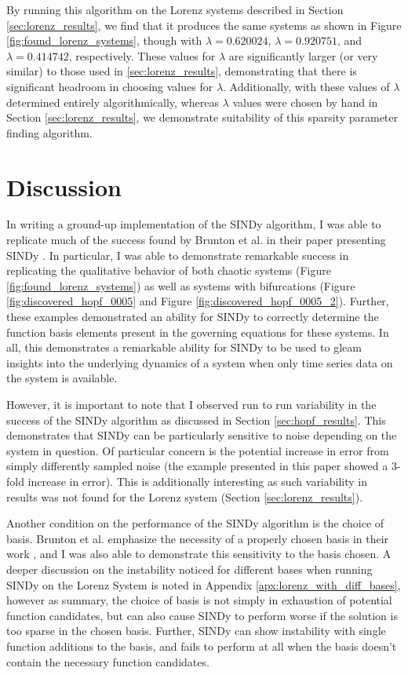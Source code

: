 \documentclass[10pt]{paper}
\begin{document}
By running this algorithm on the Lorenz systems described in Section \ref{sec:lorenz_results}, we find that it produces the same systems as shown in Figure \ref{fig:found_lorenz_systems}, though with $\lambda = 0.620024$, $\lambda = 0.920751$, and $\lambda = 0.414742$, respectively. 
These values for $\lambda$ are significantly larger (or very similar) to those used in \ref{sec:lorenz_results}, demonstrating that there is significant headroom in choosing values for $\lambda$. Additionally, with these values of $\lambda$ determined entirely algorithmically, whereas $\lambda$ values were chosen by hand in Section \ref{sec:lorenz_results}, we demonstrate suitability of this sparsity parameter finding algorithm. 




\section{Discussion} \label{sec:discussion}

In writing a ground-up implementation of the SINDy algorithm, I was able to replicate much of the success found by Brunton et al. in their paper presenting SINDy \cite{sindy}. 
In particular, I was able to demonstrate remarkable success in replicating the qualitative behavior of both chaotic systems (Figure \ref{fig:found_lorenz_systems}) as well as systems with bifurcations (Figure \ref{fig:discovered_hopf_0005} and Figure \ref{fig:discovered_hopf_0005_2}).
Further, these examples demonstrated an ability for SINDy to correctly determine the function basis elements present in the governing equations for these systems. 
In all, this demonstrates a remarkable ability for SINDy to be used to gleam insights into the underlying dynamics of a system when only time series data on the system is available. 

However, it is important to note that I observed run to run variability in the success of the SINDy algorithm as discussed in Section \ref{sec:hopf_results}.
This demonstrates that SINDy can be particularly sensitive to noise depending on the system in question. Of particular concern is the potential increase in error from simply differently sampled noise (the example presented in this paper showed a 3-fold increase in error). This is additionally interesting as such variability in results was not found for the Lorenz system (Section \ref{sec:lorenz_results}). 

Another condition on the performance of the SINDy algorithm is the choice of basis. Brunton et al. emphasize the necessity of a properly chosen basis in their work \cite{sindy}, and I was also able to demonstrate this sensitivity to the basis chosen. 
A deeper discussion on the instability noticed for different bases when running SINDy on the Lorenz System is noted in Appendix \ref{apx:lorenz_with_diff_bases}, however as summary, the choice of basis is not simply in exhaustion of potential function candidates, but can also cause SINDy to perform worse if the solution is too sparse in the chosen basis. 
Further, SINDy can show instability with single function additions to the basis, and fails to perform at all when the basis doesn't contain the necessary function candidates. 
\end{document}
